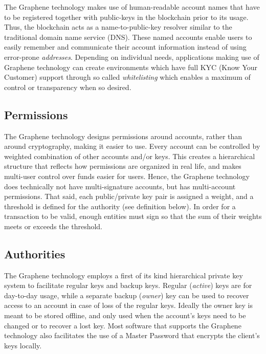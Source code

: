 The Graphene technology makes use of human-readable account names that have to be registered together with public-keys in the blockchain prior to its usage.
Thus, the blockchain acts as a name-to-public-key resolver similar to the traditional domain name service (DNS). These named accounts enable users 
to easily remember and communicate their account information instead of using error-prone \emph{addresses}. Depending on individual needs, applications 
making use of Graphene technology can create environments which have full KYC (Know Your Customer) support through so 
called \emph{whitelisting} which enables a maximum of control or transparency when so desired.

\subsection{ Permissions }
The Graphene technology designs permissions around accounts, rather than around cryptography, making it easier to use. Every account can be controlled 
by weighted combination of other accounts and/or keys. This creates a hierarchical structure that reflects how permissions are organized in real life, and 
makes multi-user control over funds easier for users. Hence, the Graphene technology does technically not have multi-signature accounts, but has multi-account permissions. 
That said, each public/private key pair is assigned a weight, and a threshold is defined for the authority (see definition below). In order for a transaction 
to be valid, enough entities must sign so that the sum of their weights meets or exceeds the threshold.

\subsection{ Authorities }
The Graphene technology employs a first of its kind hierarchical private key system to facilitate regular keys and backup keys. Regular (\emph{active}) keys are 
for day-to-day usage, while a separate backup (\emph{owner}) key can be used to recover access to an account in case of loss of the regular keys. Ideally the 
owner key is meant to be stored offline, and only used when the account's keys need to be changed or to recover a lost key. Most software that supports 
the Graphene technology also facilitates the use of a Master Password that encrypts the client's keys locally.
